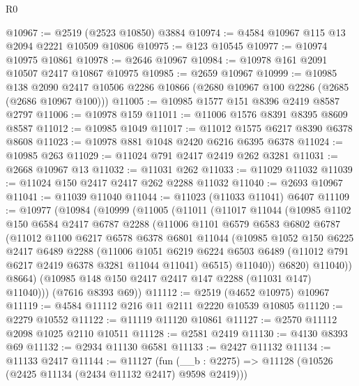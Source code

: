 \begin{lexlean}{R0}
\begin{coremodule}
@10967 := @2519 (@2523 @10850) @3884
@10974 := @4584 @10967 @115 @13 @2094 @2221 @10509 @10806
@10975 := @123 @10545
@10977 := @10974 @10975 @10861
@10978 := @2646 @10967
@10984 := @10978 @161 @2091 @10507 @2417 @10867 @10975
@10985 := @2659 @10967
@10999 := @10985
    @138
    @2090
    @2417
    @10506
    @2286
    @10866
    (@2680 @10967 @100 @2286 (@2685 (@2686 @10967 @100)))
@11005 := @10985 @1577 @151 @8396 @2419 @8587 @2797
@11006 := @10978 @159
@11011 := @11006 @1576 @8391 @8395 @8609 @8587
@11012 := @10985 @1049
@11017 := @11012 @1575 @6217 @8390 @6378 @8608
@11023 := @10978 @881 @1048 @2420 @6216 @6395 @6378
@11024 := @10985 @263
@11029 := @11024 @791 @2417 @2419 @262 @3281
@11031 := @2668 @10967 @13
@11032 := @11031 @262
@11033 := @11029 @11032
@11039 := @11024 @150 @2417 @2417 @262 @2288 @11032
@11040 := @2693 @10967
@11041 := @11039 @11040
@11044 := @11023 (@11033 @11041) @6407
@11109 := @10977
    (@10984
      (@10999
        (@11005
          (@11011
            (@11017
              @11044
              (@10985
                @1102
                @150
                @6584
                @2417
                @6787
                @2288
                (@11006
                  @1101
                  @6579
                  @6583
                  @6802
                  @6787
                  (@11012
                    @1100
                    @6217
                    @6578
                    @6378
                    @6801
                    @11044
                    (@10985
                      @1052
                      @150
                      @6225
                      @2417
                      @6489
                      @2288
                      (@11006
                        @1051
                        @6219
                        @6224
                        @6503
                        @6489
                        (@11012 @791 @6217 @2419 @6378 @3281 @11044 @11041)
                        @6515)
                      @11040))
                  @6820)
                @11040))
            @8664)
          (@10985 @148 @150 @2417 @2417 @147 @2288 (@11031 @147) @11040)))
      (@7616 @8393 @69))
@11112 := @2519 (@4652 @10975) @10967
@11119 := @4584 @11112 @216 @11 @2111 @2220 @10539 @10805
@11120 := @2279 @10552
@11122 := @11119 @11120 @10861
@11127 := @2570 @11112 @2098 @1025 @2110 @10511
@11128 := @2581 @2419
@11130 := @4130 @8393 @69
@11132 := @2934 @11130 @6581
@11133 := @2427 @11132
@11134 := @11133 @2417
@11144 := @11127
    (fun (__b : @2275) => @11128 (@10526 (@2425 @11134 (@2434 @11132 @2417) @9598 @2419)))

\end{coremodule}
\end{lexlean}
